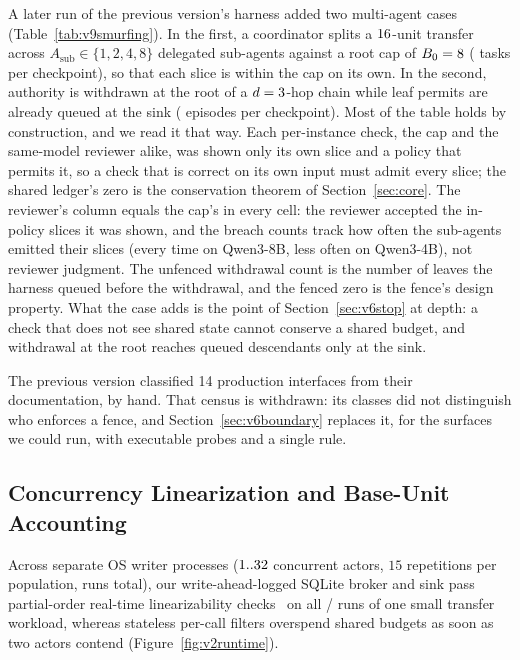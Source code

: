 A later run of the previous version's harness added two multi-agent cases (Table~\ref{tab:v9smurfing}). In the first, a
coordinator splits a \(16\)-unit transfer across \(A_{\mathrm{sub}} \in \{1,2,4,8\}\) delegated
sub-agents against a root cap of \(B_0 = 8\) (\VNineSmurfTasksPerModel{} tasks per checkpoint), so
that each slice is within the cap on its own. In the second, authority is withdrawn at the root of a
\(d = 3\)-hop chain while leaf permits are already queued at the sink
(\VNineSmurfRevEpisodesPerModel{} episodes per checkpoint). Most of the table holds by construction, and we read it that
way. Each per-instance check, the cap and the same-model reviewer alike, was shown only its own slice and a policy that
permits it, so a check that is correct on its own input must admit every slice; the shared ledger's zero is the
conservation theorem of Section~\ref{sec:core}. The reviewer's column equals the cap's in every cell: the reviewer
accepted the in-policy slices it was shown, and the breach counts track how often the sub-agents emitted their slices
(every time on Qwen3-8B, less often on Qwen3-4B), not reviewer judgment. The unfenced withdrawal count is the number of
leaves the harness queued before the withdrawal, and the fenced zero is the fence's design property. What the case adds
is the point of Section~\ref{sec:v6stop} at depth: a check that does not see shared state cannot conserve a shared
budget, and withdrawal at the root reaches queued descendants only at the sink.



 The previous version classified 14 production interfaces from their
documentation, by hand. That census is withdrawn: its classes did not distinguish who enforces a fence, and
Section~\ref{sec:v6boundary} replaces it, for the surfaces we could run, with executable probes and a single rule.

\subsection{Concurrency Linearization and Base-Unit Accounting}

Across separate OS writer processes (\(1..32\) concurrent actors, \(15\) repetitions per population, \VTwoRaceRuns{} runs total), our write-ahead-logged SQLite broker and sink pass partial-order real-time linearizability checks~\cite{herlihy1990} on all \VTwoLinearizedRuns/\VTwoRaceRuns{} runs of one small transfer workload, whereas stateless per-call filters overspend shared budgets as soon as two actors contend (Figure~\ref{fig:v2runtime}).

